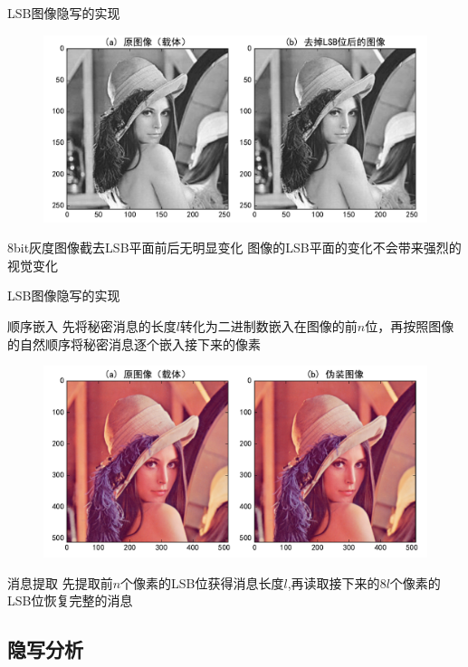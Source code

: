 \documentclass[14pt]{Bredelebeamer}
\begin{document}
\begin{frame}{LSB图像隐写的实现}
    \begin{figure}
      \centering
      \includegraphics[width=.9\textwidth]{images/demo1}
    \end{figure}
    \begin{alertblock}{8bit灰度图像截去LSB平面前后无明显变化}
      图像的LSB平面的变化不会带来强烈的视觉变化
    \end{alertblock}
\end{frame}

\begin{frame}{LSB图像隐写的实现}
  \begin{block}{顺序嵌入}
    先将秘密消息的长度$l$转化为二进制数嵌入在图像的前$n$位，再按照图像的自然顺序将秘密消息逐个嵌入接下来的像素
  \end{block}
  \pause
  \begin{figure}
    \centering
    \includegraphics[width=.7\textwidth]{images/gettys}
  \end{figure}
  \pause
  \begin{exampleblock}{消息提取}
    先提取前$n$个像素的LSB位获得消息长度$l$,再读取接下来的$8l$个像素的LSB位恢复完整的消息
  \end{exampleblock}
\end{frame}

\subsection{隐写分析}
\end{document}
